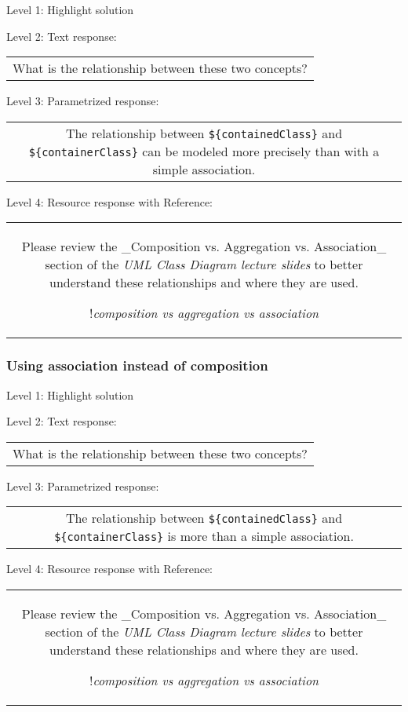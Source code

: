 \noindent Level 1: Highlight solution \medskip

\noindent Level 2: Text response: \medskip

\begin{tabular}{|c}
What is the relationship between these two concepts?
\end{tabular} \medskip

\noindent Level 3: Parametrized response: \medskip

\begin{tabular}{|c}
The relationship between \verb|${containedClass}| and \verb|${containerClass}| can be modeled more precisely than with a simple association.
\end{tabular} \medskip

\noindent Level 4: Resource response with Reference:

\begin{tabular}{|c}
Please review the _Composition vs. Aggregation vs. Association_ section of 
the \textit{UML Class Diagram lecture slides} to 
better understand these relationships and where they are used.

!\textit{composition vs aggregation vs association}
\end{tabular} \medskip


\subsubsection{Using association instead of composition}

\noindent Level 1: Highlight solution \medskip

\noindent Level 2: Text response: \medskip

\begin{tabular}{|c}
What is the relationship between these two concepts?
\end{tabular} \medskip

\noindent Level 3: Parametrized response: \medskip

\begin{tabular}{|c}
The relationship between \verb|${containedClass}| and \verb|${containerClass}| is more than a simple association.
\end{tabular} \medskip

\noindent Level 4: Resource response with Reference:

\begin{tabular}{|c}
Please review the _Composition vs. Aggregation vs. Association_ section of 
the \textit{UML Class Diagram lecture slides} to 
better understand these relationships and where they are used.

!\textit{composition vs aggregation vs association}
\end{tabular} \medskip


